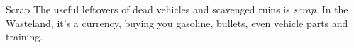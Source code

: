 
\begin{abstractsection}{Scrap}
The useful leftovers of dead vehicles and scavenged ruins is \emph{scrap}. In the Wasteland, it's a currency, buying you gasoline, bullets, even vehicle parts and training.
\end{abstractsection}
